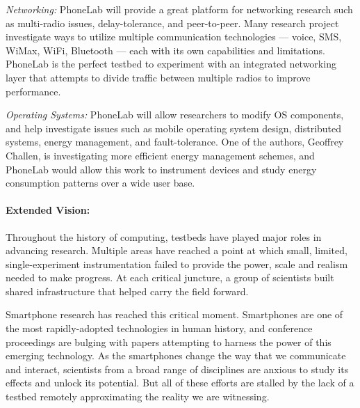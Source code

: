 \documentclass[12pt]{article}
\begin{document}
\emph{Networking:} PhoneLab will provide a great platform for networking
research such as multi-radio issues, delay-tolerance, and peer-to-peer.
Many research project investigate ways to utilize multiple communication
technologies --- voice, SMS, WiMax, WiFi, Bluetooth --- each with its own
capabilities and limitations. PhoneLab is the perfect testbed to experiment
with an integrated networking layer that attempts to divide traffic between
multiple radios to improve performance.

\emph{Operating Systems:} PhoneLab will allow researchers to modify OS
components, and help investigate issues such as mobile operating system
design, distributed systems, energy management, and fault-tolerance.
One of the authors, Geoffrey Challen, is investigating more efficient energy
management schemes, and PhoneLab would allow this work to instrument
devices and study energy consumption patterns over a wide user base.

\paragraph{Extended Vision:}
Throughout the history of computing, testbeds have played major roles in
advancing research. Multiple areas have reached a point at which small,
limited, single-experiment instrumentation failed to provide the power, scale
and realism needed to make progress. At each critical juncture, a group of
scientists built shared infrastructure that helped carry the field forward.

Smartphone research has reached this critical moment. Smartphones are one of the
most rapidly-adopted technologies in human history, and conference proceedings
are bulging with papers attempting to harness the power of this emerging
technology. As the smartphones change the way that we communicate and interact,
scientists from a broad range of disciplines are anxious to study its effects
and unlock its potential. But all of these efforts are stalled by the lack of
a testbed remotely approximating the reality we are witnessing.

\end{document}
